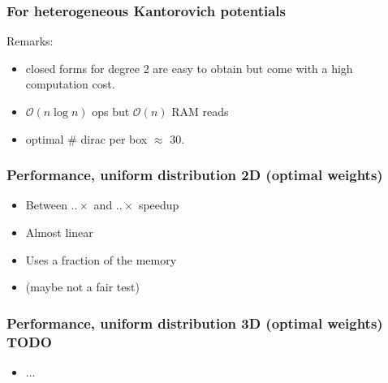 \documentclass[aspectratio=169]{beamer}
\begin{document}
\begin{frame}
    \frametitle{For heterogeneous Kantorovich potentials}

    Remarks:
    \begin{itemize}
        \item closed forms for degree 2 are easy to obtain but come with a high computation cost.
        \item $\mathcal{O}( n \log{} n )$ ops but $\mathcal{O}( n )$ RAM reads
        \item optimal $\#$ dirac per box $\approx$ 30.
    \end{itemize}
\end{frame}


\begin{frame}
    \frametitle{Performance, uniform distribution 2D (optimal weights)}

    \begin{minipage}[c][0.6\textheight][c]{0.55\textwidth}
        
    \end{minipage}
    \begin{minipage}[c][0.6\textheight][c]{0.4\textwidth}
        \begin{itemize}
            \item Between $..\times$ and $..\times$ speedup

            \bigskip
            \item Almost linear

            \bigskip
            \item Uses a fraction of the memory

            \bigskip
            \item (maybe not a fair test)
        \end{itemize}
    \end{minipage}
\end{frame}


\begin{frame}
    \frametitle{Performance, uniform distribution 3D (optimal weights)    TODO}

    \begin{minipage}[c][0.6\textheight][c]{0.55\textwidth}
        
    \end{minipage}
    \begin{minipage}[c][0.6\textheight][c]{0.4\textwidth}
        \begin{itemize}
            \item ...
        \end{itemize}
    \end{minipage}
\end{frame}
\end{document}
